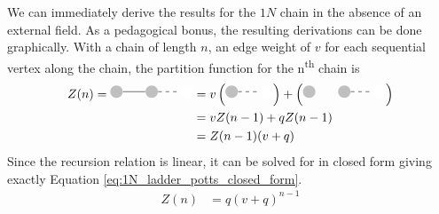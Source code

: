 We can immediately derive the results for the $1N$ chain in the absence of an external field. As a pedagogical bonus, the resulting derivations can be done graphically. With a chain of length $n$, an edge weight of $v$ for each sequential vertex along the chain, the partition function for the n\textsuperscript{th} chain is
\begin{align}
Z(n) = \TIKZoneladderA
   & = v \paren{ \TIKZoneladderB }
+ \paren{ \TIKZoneladderC }
\\ \notag
& = v Z(n-1) + q Z(n - 1) 
\\ \notag
& = Z(n-1) (v + q)
\end{align}
%
Since the recursion relation is linear, it can be solved for in closed form giving exactly Equation \ref{eq:1N_ladder_potts_closed_form}.
\begin{align}
Z(n) &= q(v+q)^{n-1}
\end{align}

